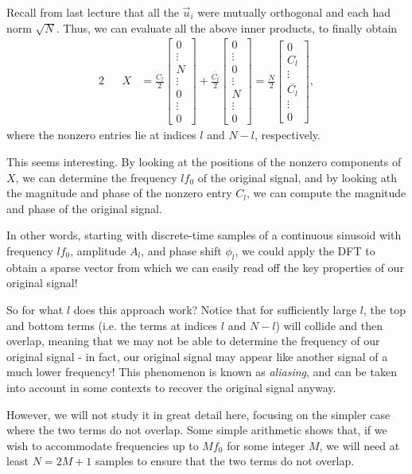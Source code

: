 \documentclass[letterpaper]{article}
\theoremstyle{remark}
\newcommand{\mat}[1]{\ensuremath{\begin{bmatrix}#1\end{bmatrix}}}
\newcommand{\eqn}[1]{\begin{alignat*}{2}#1\end{alignat*}}
\begin{document}
Recall from last lecture that all the $\vec{u}_i$ were mutually orthogonal and each had norm $\sqrt{N}$. Thus, we can evaluate all the above inner products, to finally obtain
\eqn{
    && X &= \frac{C_l}{2} \mat{0 \\ \vdots \\ N \\ \vdots \\ 0 \\ \vdots \\ 0} + \frac{\overline{C_l}}{2} \mat{0 \\ \vdots \\ 0 \\ \vdots \\ N \\ \vdots \\ 0} = \frac{N}{2} \mat{0 \\ C_l \\ \vdots \\ \overline{C_l} \\ \vdots \\ 0},
}
where the nonzero entries lie at indices $l$ and $N - l$, respectively.

This seems interesting. By looking at the positions of the nonzero components of $X$, we can determine the frequency $lf_0$ of the original signal, and by looking ath the magnitude and phase of the nonzero entry $C_l$, we can compute the magnitude and phase of the original signal. 

In other words, starting with discrete-time samples of a continuous sinusoid with frequency $lf_0$, amplitude $A_l$, and phase shift $\phi_l$, we could apply the DFT to obtain a sparse vector from which we can easily read off the key properties of our original signal!

So for what $l$ does this approach work? Notice that for sufficiently large $l$, the top and bottom terms (i.e. the terms at indices $l$ and $N-l$) will collide and then overlap, meaning that we may not be able to determine the frequency of our original signal - in fact, our original signal may appear like another signal of a much lower frequency! This phenomenon is known as \emph{aliasing}, and can be taken into account in some contexts to recover the original signal anyway. 

However, we will not study it in great detail here, focusing on the simpler case where the two terms do not overlap. Some simple arithmetic shows that, if we wish to accommodate frequencies up to $Mf_0$ for some integer $M$, we will need at least $N = 2M + 1$ samples to ensure that the two terms do not overlap.
\end{document}
